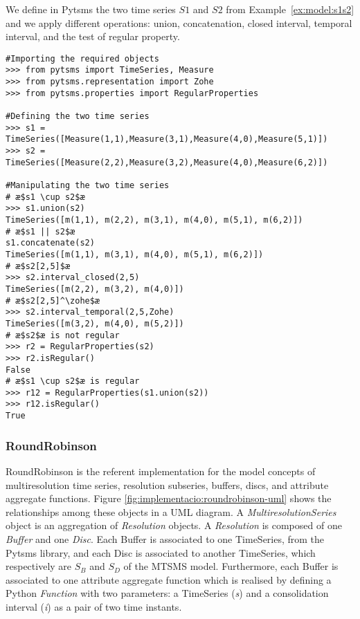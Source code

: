 \begin{example}
  We define in Pytsms the two time series $S1$ and $S2$ from
  Example~\ref{ex:model:s1s2} and we apply different operations:
  union, concatenation, closed interval, \zohe{} temporal interval,
  and the test of regular property.
\begin{lstlisting}[style=py]
#Importing the required objects
>>> from pytsms import TimeSeries, Measure
>>> from pytsms.representation import Zohe
>>> from pytsms.properties import RegularProperties

#Defining the two time series
>>> s1 = TimeSeries([Measure(1,1),Measure(3,1),Measure(4,0),Measure(5,1)])
>>> s2 = TimeSeries([Measure(2,2),Measure(3,2),Measure(4,0),Measure(6,2)])

#Manipulating the two time series
# æ$s1 \cup s2$æ
>>> s1.union(s2)
TimeSeries([m(1,1), m(2,2), m(3,1), m(4,0), m(5,1), m(6,2)])
# æ$s1 || s2$æ
s1.concatenate(s2) 
TimeSeries([m(1,1), m(3,1), m(4,0), m(5,1), m(6,2)])
# æ$s2[2,5]$æ
>>> s2.interval_closed(2,5)
TimeSeries([m(2,2), m(3,2), m(4,0)])
# æ$s2[2,5]^\zohe$æ
>>> s2.interval_temporal(2,5,Zohe)
TimeSeries([m(3,2), m(4,0), m(5,2)])
# æ$s2$æ is not regular
>>> r2 = RegularProperties(s2)
>>> r2.isRegular()
False
# æ$s1 \cup s2$æ is regular
>>> r12 = RegularProperties(s1.union(s2))
>>> r12.isRegular()
True
\end{lstlisting}
\end{example}


\subsubsection{RoundRobinson}


RoundRobinson is the referent implementation for the model concepts of
multiresolution time series, resolution subseries, buffers, discs, and
attribute aggregate functions. Figure
\ref{fig:implementacio:roundrobinson-uml} shows the relationships
among these objects in a UML diagram. A \emph{MultiresolutionSeries}
object is an aggregation of \emph{Resolution} objects. A
\emph{Resolution} is composed of one \emph{Buffer} and one
\emph{Disc}. Each Buffer is associated to one TimeSeries, from the
Pytsms library, and each Disc is associated to another TimeSeries,
which respectively are $S_B$ and $S_D$ of the MTSMS
model. Furthermore, each Buffer is associated to one attribute
aggregate function which is realised by defining a Python
\emph{Function} with two parameters: a TimeSeries (\emph{s}) and a
consolidation interval (\emph{i}) as a pair of two time instants.




